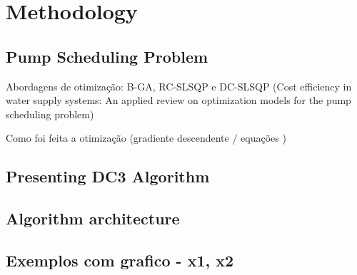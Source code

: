 \chapter{Methodology}%
\label{chapter:methodology}


\section{Pump Scheduling Problem}


Abordagens de otimização: B-GA, RC-SLSQP e DC-SLSQP (Cost efficiency in water supply systems: An applied review on optimization models for the pump scheduling problem)

Como foi feita a otimização (gradiente descendente / equações )



\section{Presenting DC3 Algorithm}

\section{Algorithm architecture}

\section {Exemplos com grafico - x1, x2}